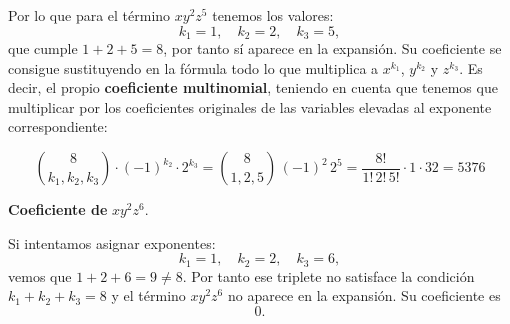 \documentclass[a4paper,12pt]{article}
\begin{document}
\begin{ejercicio}[title=Ejercicio 25]

Por lo que para el término $xy^2z^5$ tenemos los valores:
\[
k_1=1,\quad k_2=2,\quad k_3=5,
\]
que cumple $1+2+5=8$, por tanto sí aparece en la expansión. Su coeficiente se consigue sustituyendo en la fórmula todo lo que multiplica a $x^{k_1}$, $y^{k_2}$ y $z^{k_3}$. Es decir, el propio \textbf{coeficiente multinomial}, teniendo en cuenta que tenemos que multiplicar por los coeficientes originales de las variables elevadas al exponente correspondiente:

\[
\binom{8}{k_1,k_2,k_3}\cdot(-1)^{k_2}\cdot2^{k_3}
= \binom{8}{1,2,5}\,(-1)^{2}\,2^{5}
= \frac{8!}{1!\,2!\,5!}\cdot 1 \cdot 32
= \boxed{5376}
\]

\medskip

\textbf{Coeficiente de } $xy^2z^6$.

Si intentamos asignar exponentes:
\[
k_1=1,\quad k_2=2,\quad k_3=6,
\]
vemos que \(1+2+6=9\neq 8\). Por tanto ese triplete no satisface la condición $k_1+k_2+k_3=8$ y el término $xy^2z^6$ no aparece en la expansión. Su coeficiente es
\[
\boxed{0}.
\]

\end{ejercicio}
\end{document}

